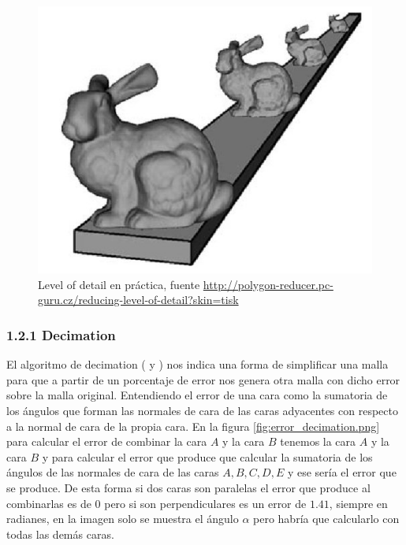 \begin{figure} %
	\centering
	\includegraphics[scale=0.5]{imagenes/polygon-reducer-lod-2.jpg} 
	\caption{ Level of detail en práctica, fuente \url{http://polygon-reducer.pc-guru.cz/reducing-level-of-detail?skin=tisk}} \label{fig:polygon-reducer-lod-2.png}
\end{figure}

\newpage
\subsubsection*{1.2.1 Decimation}
El algoritmo de decimation (\cite{OpenMeshMeshDecimation} y \cite{mirelaben-chenCS468GeometryProcessing}) nos indica una forma de simplificar una malla para que a partir de un porcentaje de error nos genera otra malla con dicho error sobre la malla original. Entendiendo el error de una cara como la sumatoria de los ángulos que forman las normales de cara de las caras adyacentes con respecto a la normal de cara de la propia cara. En la figura \ref{fig:error_decimation.png} para calcular el error de combinar la cara $A$ y la cara $B$ tenemos la cara $A$ y la cara $B$ y para calcular el error que produce que calcular la sumatoria de los ángulos de las normales de cara de las caras $A,B,C,D,E$ y ese sería el error que se produce. De esta forma si dos caras son paralelas el error que produce al combinarlas es de $0$ pero si son perpendiculares es un error de $1.41$, siempre en radianes, en la imagen solo se muestra el ángulo $\alpha$ pero habría que calcularlo con todas las demás caras.\\


